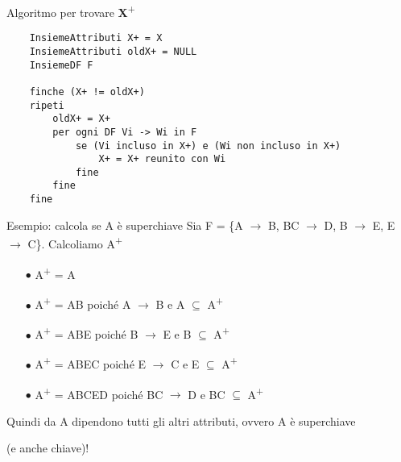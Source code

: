 \documentclass{beamer}
\begin{document}
\begin{frame}[fragile]{Algoritmo per trovare \textbf{X}\textsuperscript{+}}

    \begin{verbatim}
    InsiemeAttributi X+ = X
    InsiemeAttributi oldX+ = NULL
    InsiemeDF F
    
    finche (X+ != oldX+)
    ripeti
        oldX+ = X+
        per ogni DF Vi -> Wi in F
            se (Vi incluso in X+) e (Wi non incluso in X+)
                X+ = X+ reunito con Wi
            fine
        fine
    fine
    \end{verbatim}
\end{frame}

\begin{frame}{Esempio: calcola se A è superchiave}
Sia F = \{A $\rightarrow$ B, BC $\rightarrow$ D, B $\rightarrow$ E, E $\rightarrow$ C\}. Calcoliamo A\textsuperscript{+}
\begin{itemize}
    \item[$\bullet$] A\textsuperscript{+} = A
    \item[$\bullet$] A\textsuperscript{+} = AB poiché A $\rightarrow$ B e A $\subseteq$ A\textsuperscript{+}
    \item[$\bullet$] A\textsuperscript{+} = ABE poiché B $\rightarrow$ E e B $\subseteq$ A\textsuperscript{+}
    \item[$\bullet$] A\textsuperscript{+} = ABEC poiché E $\rightarrow$ C e E $\subseteq$ A\textsuperscript{+}
    \item[$\bullet$] A\textsuperscript{+} = ABCED poiché BC $\rightarrow$ D e BC $\subseteq$ A\textsuperscript{+}
\end{itemize}
\begin{block}{}
    Quindi da A dipendono tutti gli altri attributi, ovvero A è superchiave \par(e anche chiave)!
\end{block}
\end{frame}
\end{document}
